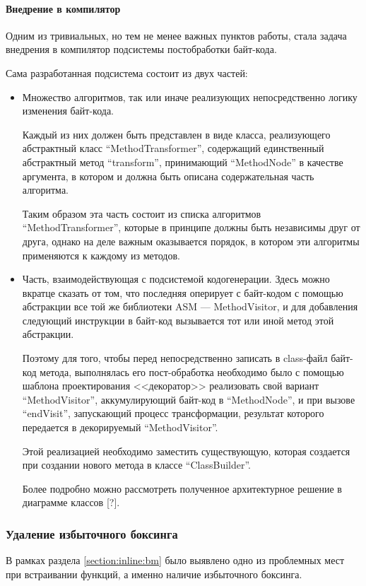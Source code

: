 \paragraph{Внедрение в компилятор}
Одним из тривиальных, но тем не менее важных пунктов работы, стала задача внедрения в компилятор
подсистемы постобработки байт-кода.

Сама разработанная подсистема состоит из двух частей:
\begin{itemize}
    \item Множество алгоритмов, так или иначе реализующих непосредственно логику изменения
    байт-кода.

    Каждый из них должен быть представлен в виде класса, реализующего абстрактный класс
    ``MethodTransformer'', содержащий единственный абстрактный метод ``transform'', принимающий
    ``MethodNode'' в качестве аргумента, в котором и должна быть описана содержательная часть
    алгоритма.

    Таким образом эта часть состоит из списка алгоритмов ``MethodTransformer'', которые в принципе
    должны быть независимы друг от друга, однако на деле важным оказывается порядок, в котором
    эти алгоритмы применяются к каждому из методов.

    \item Часть, взаимодействующая с подсистемой кодогенерации.
    Здесь можно вкратце сказать от том, что последняя оперирует с байт-кодом с помощью абстракции
    все той же библиотеки ASM --- MethodVisitor, и для добавления следующий инструкции в байт-код
    вызывается тот или иной метод этой абстракции.

    Поэтому для того, чтобы перед непосредственно записать в class-файл байт-код метода,
    выполнялась его пост-обработка необходимо было с помощью шаблона проектирования
    <<декоратор>>\cite{Gamma} реализовать свой вариант ``MethodVisitor'', аккумулирующий байт-код
    в ``MethodNode'', и при вызове ``endVisit'', запускающий процесс трансформации, результат
    которого передается в декорируемый ``MethodVisitor''.

    Этой реализацией необходимо заместить существующую, которая создается при создании нового метода
    в классе ``ClassBuilder''.

    Более подробно можно рассмотреть полученное архитектурное решение в диаграмме классов [?]. %
\end{itemize}

\subsubsection{Удаление избыточного боксинга}
В рамках раздела \ref{section:inline:bm} было выявлено одно из проблемных мест при встраивании
функций, а именно наличие избыточного боксинга.

